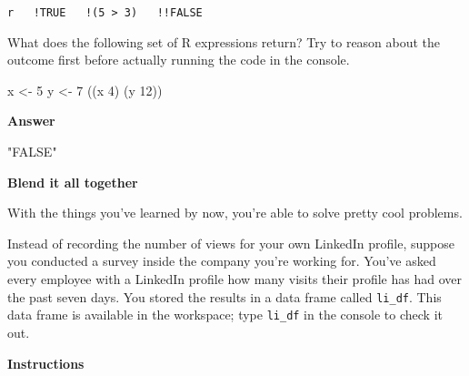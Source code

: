 \documentclass[]{article}
\newcommand{\hlnum}[1]{\textcolor[rgb]{0.816,0.125,0.439}{#1}}%
\newcommand{\hlstr}[1]{\textcolor[rgb]{0.251,0.627,0.251}{#1}}%
\newcommand{\hlstd}[1]{\textcolor[rgb]{0.251,0.251,0.251}{#1}}%
\newenvironment{Shaded}{\begin{myshaded}}{\end{myshaded}}
\renewenvironment{verbatim}{\color{codecolor}\begin{myshaded}\begin{oldverbatim}}{\end{oldverbatim}\end{myshaded}}
\newcommand{\DecValTok}[1]{\hlnum{#1}}
\newcommand{\StringTok}[1]{\hlstr{#1}}
\newcommand{\NormalTok}[1]{\hlstd{#1}}
\begin{document}
\texttt{r\ \ \ !TRUE\ \ \ !(5\ \textgreater{}\ 3)\ \ \ !!FALSE}

What does the following set of R expressions return? Try to reason about
the outcome first before actually running the code in the console.

\begin{Shaded}
\begin{Highlighting}[]
\NormalTok{x <-}\StringTok{ }\DecValTok{5}
\NormalTok{y <-}\StringTok{ }\DecValTok{7}
\OperatorTok{!}\NormalTok{(}\OperatorTok{!}\NormalTok{(x }\OperatorTok{<}\StringTok{ }\DecValTok{4}\NormalTok{) }\OperatorTok{&}\StringTok{ }\OperatorTok{!!!}\NormalTok{(y }\OperatorTok{>}\StringTok{ }\DecValTok{12}\NormalTok{))}
\end{Highlighting}
\end{Shaded}

\textbf{Answer}

\begin{verbatim}
   [1] "FALSE"
\end{verbatim}

\textbf{Blend it all together}

With the things you've learned by now, you're able to solve pretty cool
problems.

Instead of recording the number of views for your own LinkedIn profile,
suppose you conducted a survey inside the company you're working for.
You've asked every employee with a LinkedIn profile how many visits
their profile has had over the past seven days. You stored the results
in a data frame called \texttt{li\_df}. This data frame is available in
the workspace; type \texttt{li\_df} in the console to check it out.

\textbf{Instructions}
\end{document}
